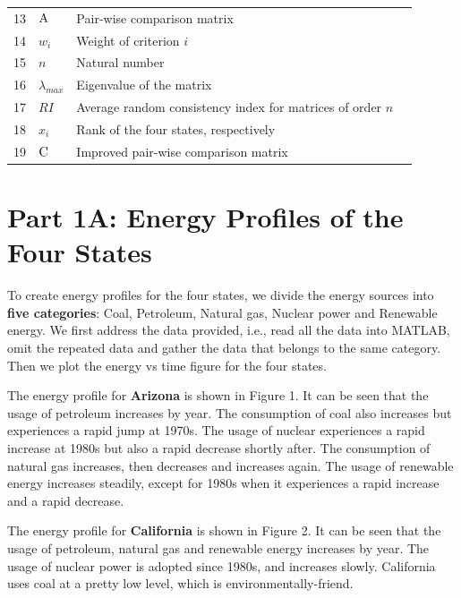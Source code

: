 \documentclass{mcmthesis}
\begin{document}
\begin{center}
\begin{longtable}{p{}<{\centering} p{}<{\centering} 
p{}m{}}
13& $\rm{A}$       & Pair-wise comparison matrix                      \\
14& $w_i$       & Weight of criterion $i$                      \\
15& $n$       & Natural number                       \\
16& $\lambda_{max}$       & Eigenvalue of the matrix \\                                                                
17& $RI$ & Average random consistency index for matrices of order $n$ \\
18& $x_i$ & Rank of the four states, respectively \\
19& $ \rm{C} $ & Improved pair-wise comparison matrix  \\

 \bottomrule[1.5pt]

 \end{longtable}
 \end{center}
\section{Part 1A: Energy Profiles of the Four States}

To create energy profiles for the four states, we divide the energy sources into {\bf{five categories}}: Coal, Petroleum, Natural gas, Nuclear power and Renewable energy. We first address the data provided, i.e., read all the data into MATLAB, omit the repeated data and gather the data that belongs to the same category. Then we plot the energy vs time figure for the four states.

The energy profile for {\bf{Arizona}} is shown in Figure 1. It can be seen that the usage of petroleum increases by year. The consumption of coal also increases but experiences a rapid jump at 1970s. The usage of nuclear experiences a rapid increase at 1980s but also a rapid decrease shortly after. The consumption of natural gas increases, then decreases and increases again. The usage of renewable energy increases steadily, except for 1980s when it experiences a rapid increase and a rapid decrease.

The energy profile for {\bf{California}} is shown in Figure 2. It can be seen that the usage of petroleum, natural gas and renewable energy increases by year. The usage of nuclear power is adopted since 1980s, and increases slowly. California uses coal at a pretty low level, which is environmentally-friend.
 
\end{document}
